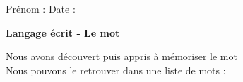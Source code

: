\documentclass[a4paper, 11pt]{article}
\begin{document}
\sloppy
\pagestyle{empty}
\begin{onehalfspace}

\sffamily 
\noindent \Large Prénom : \fbox{
    \begin{minipage}{9cm}
        \vspace{1.2cm} \hspace{9cm}
    \end{minipage}
} \hspace{1.5cm}\Large Date : \vspace{2mm}\\
\begin{minipage}{12cm}
    \begin{center}
    \Large \bfseries Langage écrit - Le mot \MakeUppercase{
    }
    \end{center}
    \normalsize Nous avons découvert puis appris à mémoriser le mot \MakeUppercase{
    }\\
    Nous pouvons le retrouver dans une liste de mots :
\end{minipage}

\vspace{0.25cm} 


\end{onehalfspace}
\end{document}
